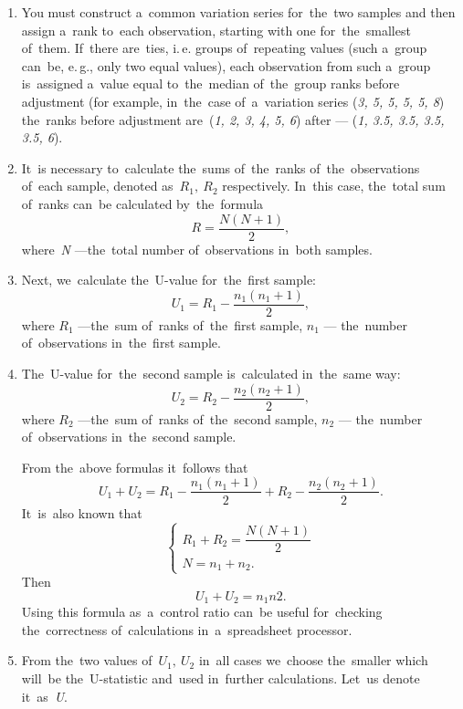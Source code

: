 \documentclass[]{scrreprt}
\begin{document}
\begin{enumerate}
	\item You must construct a~common variation series for~the~two samples and then assign a~rank to~each observation, starting with one for~the~smallest of~them. If~there are~ties, i.\,e. groups of~repeating values (such a~group can~be, e.\,g., only two equal values), each observation from such a~group is~assigned a~value equal to~the~median of~the~group ranks before adjustment (for example, in~the~case of~a~variation series (\textit{3, 5, 5, 5, 5, 8}) the~ranks before adjustment are~(\textit{1, 2, 3, 4, 5, 6}) after --- (\textit{1, 3.5, 3.5, 3.5, 3.5, 6}).
	\item It~is necessary to~calculate the~sums of~the~ranks of~the~observations of~each sample, denoted as~${R_{1},\ R_{2}}$ respectively. In~this case, the~total sum of~ranks can~be calculated by~the~formula
	\begin{equation}\label{eq:common-R}
	R = \frac{N(N+1)}{2},
	\end{equation}
	where~\textit{N} ---the~total number of~observations in~both samples.
	\item Next, we~calculate the~U-value for~the~first sample:
	\begin{equation}\label{eq:U1}
	U_{1}=R_{1}-\frac{n_{1}(n_{1}+1)}{2},
	\end{equation}
	where $R_{1}$ ---the~sum of~ranks of~the~first sample, $n_{1}$ --- the~number of~observations in~the~first sample.
	\item The~U-value for~the~second sample is~calculated in~the~same way:
	\begin{equation}\label{eq:U2}
	U_{2}=R_{2}-\frac{n_{2}(n_{2}+1)}{2},
	\end{equation}
	where $R_{2}$ ---the~sum of~ranks of~the~second sample, $n_{2}$ --- the~number of~observations in~the~second sample.
	
	From the~above formulas it~follows that
	\begin{equation}\label{eq:U1-U2-relation}
	U_{1}+U_{2} = R_{1}-\frac{n_{1}(n_{1}+1)}{2} + R_{2}-\frac{n_{2}(n_{2}+1)}{2}.
	\end{equation}
	It~is~also known that
	\begin{equation}\label{eq:R-N-relation}
	\begin{cases}
	R_{1}+R_{2}=\dfrac{N(N+1)}{2}\\
	N=n_{1}+n_{2}.
	\end{cases}
	\end{equation}
	Then
	\begin{equation}\label{eq:check-U-value}
	U_{1}+U_{2}=n_{1}n{2}.
	\end{equation}
	Using this formula as~a~control ratio can~be useful for~checking the~correctness of~calculations in~a~spreadsheet processor.
	\item From the~two values of~$U_{1},\ U_{2}$ in~all cases we~choose the~smaller which will~be the~U-statistic and~used in~further calculations. Let~us denote it~as~\emph{U}.
\end{enumerate}
%
\end{document}
